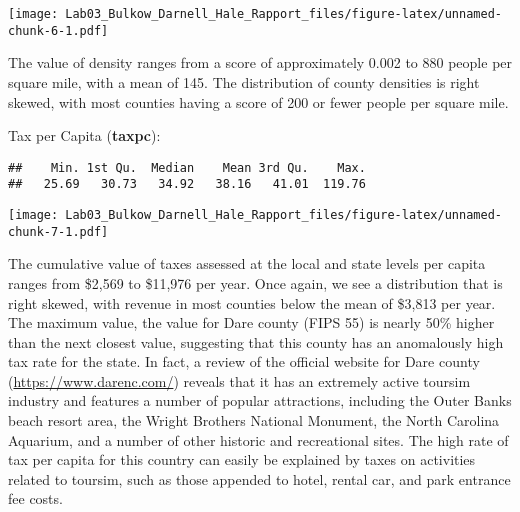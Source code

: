 \documentclass[]{article}
\newenvironment{Shaded}{\begin{snugshade}}{\end{snugshade}}
\newcommand{\KeywordTok}[1]{\textcolor[rgb]{0.13,0.29,0.53}{\textbf{#1}}}
\newcommand{\DataTypeTok}[1]{\textcolor[rgb]{0.13,0.29,0.53}{#1}}
\newcommand{\DecValTok}[1]{\textcolor[rgb]{0.00,0.00,0.81}{#1}}
\newcommand{\StringTok}[1]{\textcolor[rgb]{0.31,0.60,0.02}{#1}}
\newcommand{\OperatorTok}[1]{\textcolor[rgb]{0.81,0.36,0.00}{\textbf{#1}}}
\newcommand{\NormalTok}[1]{#1}
\begin{document}
\texttt{[image: Lab03\_Bulkow\_Darnell\_Hale\_Rapport\_files/figure-latex/unnamed-chunk-6-1.pdf]}

The value of density ranges from a score of approximately 0.002 to 880
people per square mile, with a mean of 145. The distribution of county
densities is right skewed, with most counties having a score of 200 or
fewer people per square mile.

Tax per Capita (\textbf{taxpc}):

\begin{Shaded}
\end{Shaded}

\begin{verbatim}
##    Min. 1st Qu.  Median    Mean 3rd Qu.    Max. 
##   25.69   30.73   34.92   38.16   41.01  119.76
\end{verbatim}

\begin{Shaded}
\end{Shaded}

\texttt{[image: Lab03\_Bulkow\_Darnell\_Hale\_Rapport\_files/figure-latex/unnamed-chunk-7-1.pdf]}

The cumulative value of taxes assessed at the local and state levels per
capita ranges from \$2,569 to \$11,976 per year. Once again, we see a
distribution that is right skewed, with revenue in most counties below
the mean of \$3,813 per year. The maximum value, the value for Dare
county (FIPS 55) is nearly 50\% higher than the next closest value,
suggesting that this county has an anomalously high tax rate for the
state. In fact, a review of the official website for Dare county
(\url{https://www.darenc.com/}) reveals that it has an extremely active
toursim industry and features a number of popular attractions, including
the Outer Banks beach resort area, the Wright Brothers National
Monument, the North Carolina Aquarium, and a number of other historic
and recreational sites. The high rate of tax per capita for this country
can easily be explained by taxes on activities related to toursim, such
as those appended to hotel, rental car, and park entrance fee costs.
\end{document}
